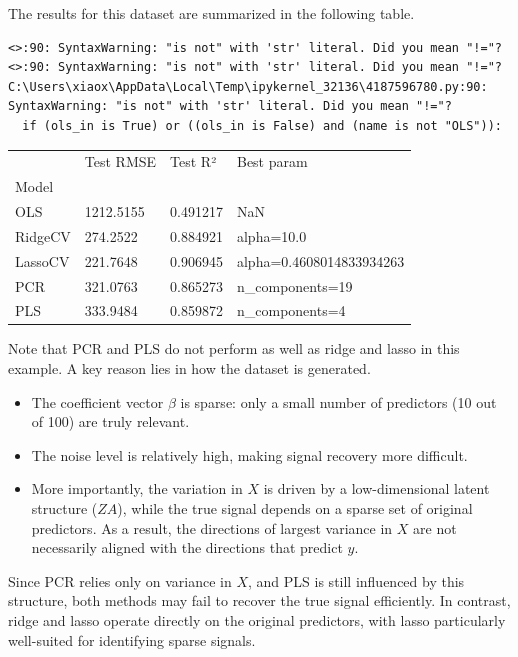 \documentclass[
  letterpaper,
  DIV=11,
  numbers=noendperiod]{scrreprt}
\newcounter{none} %
\providecommand{\tightlist}{%
  \setlength{\itemsep}{0pt}\setlength{\parskip}{0pt}}
\theoremstyle{definition}
\theoremstyle{definition}
\theoremstyle{plain}
\theoremstyle{plain}
\theoremstyle{remark}
\begin{document}
The results for this dataset are summarized in the following table.

\begin{verbatim}
<>:90: SyntaxWarning: "is not" with 'str' literal. Did you mean "!="?
<>:90: SyntaxWarning: "is not" with 'str' literal. Did you mean "!="?
C:\Users\xiaox\AppData\Local\Temp\ipykernel_32136\4187596780.py:90: SyntaxWarning: "is not" with 'str' literal. Did you mean "!="?
  if (ols_in is True) or ((ols_in is False) and (name is not "OLS")):
\end{verbatim}

{\def\LTcaptype{none} %
\begin{longtable}[]{@{}llll@{}}
\toprule\noalign{}
& Test RMSE & Test R² & Best param \\
Model & & & \\
\midrule\noalign{}
\endhead
\bottomrule\noalign{}
\endlastfoot
OLS & 1212.5155 & 0.491217 & NaN \\
RidgeCV & 274.2522 & 0.884921 & alpha=10.0 \\
LassoCV & 221.7648 & 0.906945 & alpha=0.4608014833934263 \\
PCR & 321.0763 & 0.865273 & n\_components=19 \\
PLS & 333.9484 & 0.859872 & n\_components=4 \\
\end{longtable}
}

Note that PCR and PLS do not perform as well as ridge and lasso in this
example. A key reason lies in how the dataset is generated.

\begin{itemize}
\tightlist
\item
  The coefficient vector \(\beta\) is sparse: only a small number of
  predictors (10 out of 100) are truly relevant.
\item
  The noise level is relatively high, making signal recovery more
  difficult.
\item
  More importantly, the variation in \(X\) is driven by a
  low-dimensional latent structure (\(Z A\)), while the true signal
  depends on a sparse set of original predictors. As a result, the
  directions of largest variance in \(X\) are not necessarily aligned
  with the directions that predict \(y\).
\end{itemize}

Since PCR relies only on variance in \(X\), and PLS is still influenced
by this structure, both methods may fail to recover the true signal
efficiently. In contrast, ridge and lasso operate directly on the
original predictors, with lasso particularly well-suited for identifying
sparse signals.
\end{document}
